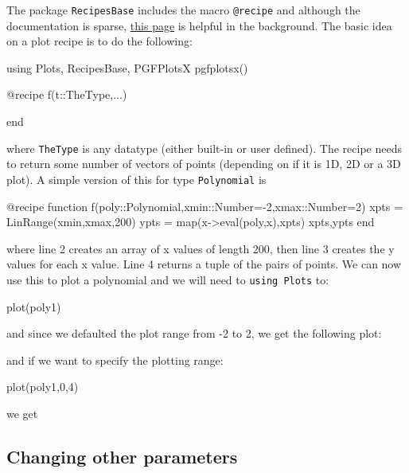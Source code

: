 The package \texttt{RecipesBase} includes the macro \texttt{@recipe} and although the documentation is sparse, \href{https://github.com/JuliaPlots/RecipesBase.jl}{this page} is helpful in the background.  The basic idea on a plot recipe is to do the following:
%
\begin{jlcode}[poly]
using Plots, RecipesBase, PGFPlotsX
pgfplotsx()
\end{jlcode}
\begin{jlverbatim}[poly]
@recipe f(t::TheType,...)

end
\end{jlverbatim}
%
where \texttt{TheType} is any datatype (either built-in or user defined).  The recipe needs to return some number of vectors of points (depending on if it is 1D, 2D or a 3D plot). A simple version of this for type  \texttt{Polynomial} is
%
\begin{jlblock}[poly][numbers=left]
@recipe function f(poly::Polynomial,xmin::Number=-2,xmax::Number=2)
  xpts = LinRange(xmin,xmax,200)
  ypts = map(x->eval(poly,x),xpts)
  xpts,ypts
end
\end{jlblock}
%
where line 2 creates an array of x values of length 200, then line 3 creates the y values for each x value.  Line 4 returns a tuple of the pairs of points.  We can now use this to plot a polynomial and we will need to \texttt{using\ Plots} to:

\begin{jlblock}[poly]
plot(poly1)
\end{jlblock}

and since we defaulted the plot range from -2 to 2, we get the following
plot: 
\begin{center}
\pgfplotsset{scale=0.6}
\end{center}
%
and if we want to specify the plotting range:

\begin{jlblock}[poly]
plot(poly1,0,4)
\end{jlblock}

we get
\begin{center}
\pgfplotsset{scale=0.6}
\end{center}



\subsection{Changing other parameters}

